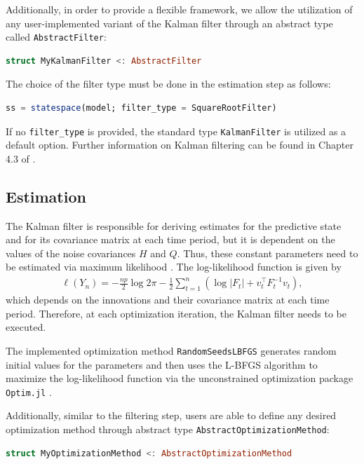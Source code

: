 \documentclass{juliacon}
\begin{document}
Additionally, in order to provide a flexible framework, we allow the utilization of any user-implemented variant of the Kalman filter through an abstract type called \texttt{AbstractFilter}:
%
\begin{lstlisting}[language = Julia]
struct MyKalmanFilter <: AbstractFilter
\end{lstlisting}

The choice of the filter type must be done in the estimation step as follows:
%
\begin{lstlisting}[language = Julia]
ss = statespace(model; filter_type = SquareRootFilter)
\end{lstlisting}

If no \texttt{filter\_type} is provided, the standard type \texttt{KalmanFilter} is utilized as a default option. Further information on Kalman filtering can be found in Chapter 4.3 of \cite{durbin2012time}.

\subsection{Estimation}

The Kalman filter is responsible for deriving estimates for the predictive state and for its covariance matrix at each time period, but it is dependent on the values of the noise covariances $H$ and $Q$. Thus, these constant parameters need to be estimated via maximum likelihood \cite{casella2002statistical}. The log-likelihood function is given by
%
\begin{align}
    \ell(Y_{n}) = -\frac{np}{2} \log 2 \pi - \frac{1}{2} \sum_{t=1}^{n} (\log |F_{t}| + v_{t}^{\top} F_{t}^{-1} v_{t}),
\end{align}
%
which depends on the innovations and their covariance matrix at each time period. Therefore, at each optimization iteration, the Kalman filter needs to be executed.

The implemented optimization method \texttt{RandomSeedsLBFGS} generates random initial values for the parameters and then uses the L-BFGS algorithm \cite{liu1989limited} to maximize the log-likelihood function via the unconstrained optimization package \texttt{Optim.jl} \cite{mogensen2018optim}.

Additionally, similar to the filtering step, users are able to define any desired optimization method through abstract type \texttt{AbstractOptimizationMethod}:
%
\begin{lstlisting}[language = Julia]
struct MyOptimizationMethod <: AbstractOptimizationMethod
\end{lstlisting}
\end{document}
